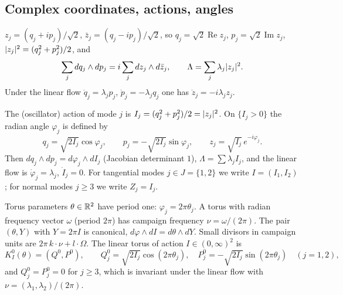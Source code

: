 \subsection{Complex coordinates, actions, angles}\label{bpW:w0:complex}

\begin{definition}\label{bpW:w0:z}
$z_j=(q_j+ip_j)/\sqrt2$, $\bar z_j=(q_j-ip_j)/\sqrt2$, so $q_j=\sqrt2\operatorname{Re}z_j$,
$p_j=\sqrt2\operatorname{Im}z_j$, $\lvert z_j\rvert^2=(q_j^2+p_j^2)/2$, and
\[\sum_jdq_j\wedge dp_j=i\sum_jdz_j\wedge d\bar z_j,\qquad \Lambda=\sum_j\lambda_j\lvert z_j\rvert^2.\]
Under the linear flow $\dot q_j=\lambda_jp_j$, $\dot p_j=-\lambda_jq_j$ one has $\dot z_j=-i\lambda_jz_j$.
\end{definition}

\begin{definition}\label{bpW:w0:actions}
The (oscillator) action of mode $j$ is $I_j=(q_j^2+p_j^2)/2=\lvert z_j\rvert^2$. On $\{I_j>0\}$ the radian angle $\varphi_j$ is
defined by
\[q_j=\sqrt{2I_j}\cos\varphi_j,\qquad p_j=-\sqrt{2I_j}\sin\varphi_j,\qquad z_j=\sqrt{I_j}\,e^{-i\varphi_j}.\]
Then $dq_j\wedge dp_j=d\varphi_j\wedge dI_j$ (Jacobian determinant $1$), $\Lambda=\sum\lambda_jI_j$, and the linear
flow is $\dot\varphi_j=\lambda_j$, $\dot I_j=0$. For tangential modes $j\in J=\{1,2\}$ we write $I=(I_1,I_2)$; for
normal modes $j\ge3$ we write $Z_j=I_j$.
\end{definition}

\begin{convention}\label{bpW:w0:periodone}
Torus parameters $\theta\in\mathbb{R}^2$ have period one: $\varphi_j=2\pi\theta_j$. A torus with radian frequency
vector $\omega$ (period $2\pi$) has campaign frequency $\nu=\omega/(2\pi)$. The pair $(\theta,Y)$ with $Y=2\pi I$ is
canonical, $d\varphi\wedge dI=d\theta\wedge dY$. Small divisors in campaign units are $2\pi\,k\cdot\nu+l\cdot\Omega$.
The linear torus of action $I\in(0,\infty)^2$ is
\[K^0_I(\theta)=(Q^0,P^0),\qquad Q^0_j=\sqrt{2I_j}\cos(2\pi\theta_j),\quad P^0_j=-\sqrt{2I_j}\sin(2\pi\theta_j)\quad (j=1,2),\]
and $Q^0_j=P^0_j=0$ for $j\ge3$,
which is invariant under the linear flow with $\nu=(\lambda_1,\lambda_2)/(2\pi)$.
\end{convention}

